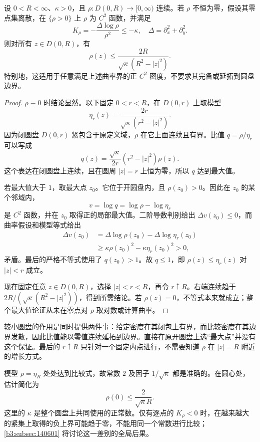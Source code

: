 \begin{theorem}\label{b3:thm:14-ahlfors-schwarz}
设 \(0<R<\infty\)、\(\kappa>0\)，且 \(\rho:D(0,R)\to[0,\infty)\) 连续。若 \(\rho\) 不恒为零，假设其零点集离散，在 \(\{\rho>0\}\) 上 \(\rho\) 为 \(C^2\) 函数，并满足
\[
 K_\rho=-\frac{\Delta\log\rho}{\rho^2}\le-\kappa,
 \quad \Delta=\partial_x^2+\partial_y^2.
\]
则对所有 \(z\in D(0,R)\)，有
\[
 \rho(z)\le\frac{2R}{\sqrt\kappa(R^2-|z|^2)}.
\]
特别地，这适用于任意满足上述曲率界的正 \(C^2\) 密度，不要求其完备或延拓到圆盘边界。
\end{theorem}
\begin{proof}
\(\rho\equiv0\) 时结论显然。以下固定 \(0<r<R\)，在 \(D(0,r)\) 上取模型
\[
 \eta_r(z)=\frac{2r}{\sqrt\kappa(r^2-|z|^2)}.
\]
因为闭圆盘 \(\overline{D(0,r)}\) 紧包含于原定义域，\(\rho\) 在它上面连续且有界。比值 \(q=\rho/\eta_r\) 可以写成
\[
 q(z)=\frac{\sqrt\kappa}{2r}(r^2-|z|^2)\rho(z).
\]
这个表达在闭圆盘上连续，且在圆周 \(|z|=r\) 上恒为零，所以 \(q\) 达到最大值。

若最大值大于 \(1\)，取最大点 \(z_0\)。它位于开圆盘内，且 \(\rho(z_0)>0\)。因此在 \(z_0\) 的某个邻域内，
\[
 v=\log q=\log\rho-\log\eta_r
\]
是 \(C^2\) 函数，并在 \(z_0\) 取得正的局部最大值。二阶导数判别给出 \(\Delta v(z_0)\le0\)，而曲率假设和模型等式给出
\[
 \begin{aligned}
 \Delta v(z_0)
 &=\Delta\log\rho(z_0)-\Delta\log\eta_r(z_0)\\
 &\ge\kappa\rho(z_0)^2-\kappa\eta_r(z_0)^2
 >0,
 \end{aligned}
\]
矛盾。最后的严格不等式使用了 \(q(z_0)>1\)。故 \(q\le1\)，即 \(\rho(z)\le\eta_r(z)\) 对 \(|z|<r\) 成立。

现在固定任意 \(z\in D(0,R)\)，选择 \(|z|<r<R\)，再令 \(r\uparrow R\)。右端连续趋于 \(2R/(\sqrt\kappa(R^2-|z|^2))\)，得到所需结论。若 \(\rho(z)=0\)，不等式本来就成立；整个最大值论证从未在零点对 \(\rho\) 取对数或计算曲率。
\end{proof}

较小圆盘的作用是同时提供两件事：给定密度在其闭包上有界，而比较密度在其边界发散，因此比值能以零值连续延拓到边界。直接在原开圆盘上选“最大点”并没有这个保证。最后的 \(r\uparrow R\) 只针对一个固定内点进行，不需要知道 \(\rho\) 在 \(|z|=R\) 附近的增长方式。

\ProseParagraphBreak
模型 \(\rho=\eta_R\) 处处达到比较式，故常数 \(2\) 及因子 \(1/\sqrt\kappa\) 都是准确的。在圆心处，估计简化为
\[
 \rho(0)\le\frac{2}{\sqrt\kappa R}.
\]
这里的 \(\kappa\) 是整个圆盘上共同使用的正常数。仅有逐点的 \(K_\rho<0\) 时，在越来越大的紧集上取得的负上界可能趋于零，不能用同一个常数进行比较；\cref{b3:subsec:140601} 将讨论这一差别的全局后果。

